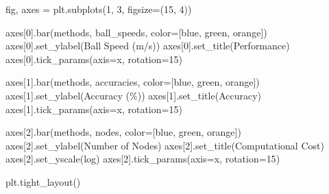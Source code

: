 \documentclass[
  letterpaper,
  DIV=11,
  numbers=noendperiod]{scrartcl}
\newenvironment{Shaded}{\begin{snugshade}}{\end{snugshade}}
\newcommand{\DecValTok}[1]{\textcolor[rgb]{0.68,0.00,0.00}{#1}}
\newcommand{\NormalTok}[1]{\textcolor[rgb]{0.00,0.23,0.31}{#1}}
\newcommand{\OperatorTok}[1]{\textcolor[rgb]{0.37,0.37,0.37}{#1}}
\newcommand{\StringTok}[1]{\textcolor[rgb]{0.13,0.47,0.30}{#1}}
\begin{document}
\begin{Shaded}
\begin{Highlighting}[]
\NormalTok{fig, axes }\OperatorTok{=}\NormalTok{ plt.subplots(}\DecValTok{1}\NormalTok{, }\DecValTok{3}\NormalTok{, figsize}\OperatorTok{=}\NormalTok{(}\DecValTok{15}\NormalTok{, }\DecValTok{4}\NormalTok{))}

\NormalTok{axes[}\DecValTok{0}\NormalTok{].bar(methods, ball\_speeds, color}\OperatorTok{=}\NormalTok{[}\StringTok{\textquotesingle{}blue\textquotesingle{}}\NormalTok{, }\StringTok{\textquotesingle{}green\textquotesingle{}}\NormalTok{, }\StringTok{\textquotesingle{}orange\textquotesingle{}}\NormalTok{])}
\NormalTok{axes[}\DecValTok{0}\NormalTok{].set\_ylabel(}\StringTok{\textquotesingle{}Ball Speed (m/s)\textquotesingle{}}\NormalTok{)}
\NormalTok{axes[}\DecValTok{0}\NormalTok{].set\_title(}\StringTok{\textquotesingle{}Performance\textquotesingle{}}\NormalTok{)}
\NormalTok{axes[}\DecValTok{0}\NormalTok{].tick\_params(axis}\OperatorTok{=}\StringTok{\textquotesingle{}x\textquotesingle{}}\NormalTok{, rotation}\OperatorTok{=}\DecValTok{15}\NormalTok{)}

\NormalTok{axes[}\DecValTok{1}\NormalTok{].bar(methods, accuracies, color}\OperatorTok{=}\NormalTok{[}\StringTok{\textquotesingle{}blue\textquotesingle{}}\NormalTok{, }\StringTok{\textquotesingle{}green\textquotesingle{}}\NormalTok{, }\StringTok{\textquotesingle{}orange\textquotesingle{}}\NormalTok{])}
\NormalTok{axes[}\DecValTok{1}\NormalTok{].set\_ylabel(}\StringTok{\textquotesingle{}Accuracy (\%)\textquotesingle{}}\NormalTok{)}
\NormalTok{axes[}\DecValTok{1}\NormalTok{].set\_title(}\StringTok{\textquotesingle{}Accuracy\textquotesingle{}}\NormalTok{)}
\NormalTok{axes[}\DecValTok{1}\NormalTok{].tick\_params(axis}\OperatorTok{=}\StringTok{\textquotesingle{}x\textquotesingle{}}\NormalTok{, rotation}\OperatorTok{=}\DecValTok{15}\NormalTok{)}

\NormalTok{axes[}\DecValTok{2}\NormalTok{].bar(methods, nodes, color}\OperatorTok{=}\NormalTok{[}\StringTok{\textquotesingle{}blue\textquotesingle{}}\NormalTok{, }\StringTok{\textquotesingle{}green\textquotesingle{}}\NormalTok{, }\StringTok{\textquotesingle{}orange\textquotesingle{}}\NormalTok{])}
\NormalTok{axes[}\DecValTok{2}\NormalTok{].set\_ylabel(}\StringTok{\textquotesingle{}Number of Nodes\textquotesingle{}}\NormalTok{)}
\NormalTok{axes[}\DecValTok{2}\NormalTok{].set\_title(}\StringTok{\textquotesingle{}Computational Cost\textquotesingle{}}\NormalTok{)}
\NormalTok{axes[}\DecValTok{2}\NormalTok{].set\_yscale(}\StringTok{\textquotesingle{}log\textquotesingle{}}\NormalTok{)}
\NormalTok{axes[}\DecValTok{2}\NormalTok{].tick\_params(axis}\OperatorTok{=}\StringTok{\textquotesingle{}x\textquotesingle{}}\NormalTok{, rotation}\OperatorTok{=}\DecValTok{15}\NormalTok{)}

\NormalTok{plt.tight\_layout()}
\end{Highlighting}
\end{Shaded}
\end{document}
